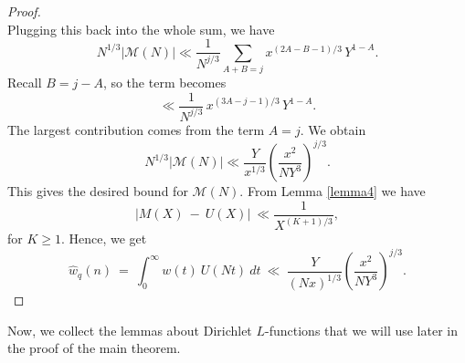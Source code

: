 \documentclass[oneside,reqno,10pt]{amsart}
\numberwithin{equation}{section}
\theoremstyle{plain}
\theoremstyle{definition}
\numberwithin{equation}{section}
\begin{document}
\begin{proof}
\begin{equation*}
\end{equation*}
Plugging this back into the whole sum, we have
\begin{equation*}
    N^{1/3} |\mathcal{M}(N)| \ll \frac{1}{N^{j/3}} \sum_{A + B = j} x^{(2A - B - 1)/3}\, Y^{1 - A}.
\end{equation*}
Recall $B = j - A$, so the term becomes
\begin{equation*}
    \ll \frac{1}{N^{j/3}}\, x^{(3A - j - 1)/3}\, Y^{1 - A}.
\end{equation*}
The largest contribution comes from the term $A = j$. We obtain
\begin{equation*}
    N^{1/3} |\mathcal{M}(N)| \ll \frac{Y}{x^{1/3}} \left( \frac{x^2}{N Y^3} \right)^{j/3}.
\end{equation*}
This gives the desired bound for $\mathcal{M}(N)$. From Lemma \ref{lemma4} we have 
\begin{equation*}
    \left|M(X)\  -\  U(X)\right|\ \ll  \frac{1}{X^{(K+1)/3}},
\end{equation*}
for $K\geq 1$. Hence,  we get
\begin{equation*}
    \hat{w}_q(n)\ =\ \int_{0}^{\infty} w(t)\  U(Nt)\ dt\ \ll \  \frac{Y}{(Nx)^{1/3}} \left( \frac{x^2}{N Y^3} \right)^{j/3}.
\end{equation*}
\end{proof}
Now, we collect the lemmas about Dirichlet $L$-functions that we will use later in the proof of the main theorem.
\end{document}

